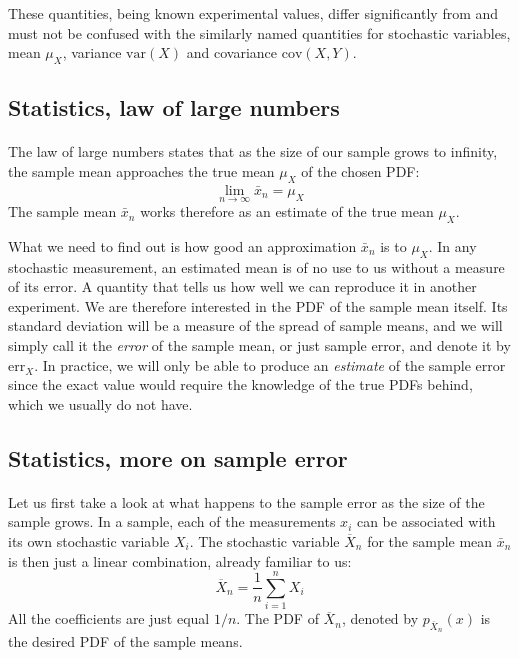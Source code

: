 \documentclass[%
oneside,                 %
final,                   %
10pt]{article}
\begin{document}
These quantities, being known experimental values, differ
significantly from and must not be confused with the similarly named
quantities for stochastic variables, mean $\mu_X$, variance $\mathrm{var}(X)$
and covariance $\mathrm{cov}(X,Y)$.



\subsection*{Statistics, law of large numbers}

\paragraph{}
The law of large numbers
states that as the size of our sample grows to infinity, the sample
mean approaches the true mean $\mu_X^{\phantom X}$ of the chosen PDF:
\[
\lim_{n\to\infty}\bar{x}_n = \mu_X^{\phantom X}
\]
The sample mean $\bar{x}_n$ works therefore as an estimate of the true
mean $\mu_X^{\phantom X}$.

What we need to find out is how good an approximation $\bar{x}_n$ is to
$\mu_X^{\phantom X}$. In any stochastic measurement, an estimated
mean is of no use to us without a measure of its error. A quantity
that tells us how well we can reproduce it in another experiment. We
are therefore interested in the PDF of the sample mean itself. Its
standard deviation will be a measure of the spread of sample means,
and we will simply call it the \emph{error} of the sample mean, or
just sample error, and denote it by $\mathrm{err}_X^{\phantom X}$. In
practice, we will only be able to produce an \emph{estimate} of the
sample error since the exact value would require the knowledge of the
true PDFs behind, which we usually do not have.




\subsection*{Statistics, more on sample error}

\paragraph{}
Let us first take a look at what happens to the sample error as the
size of the sample grows. In a sample, each of the measurements $x_i$
can be associated with its own stochastic variable $X_i$. The
stochastic variable $\overline X_n$ for the sample mean $\bar{x}_n$ is
then just a linear combination, already familiar to us:
\[
\overline X_n = \frac{1}{n}\sum_{i=1}^n X_i
\]
All the coefficients are just equal $1/n$. The PDF of $\overline X_n$,
denoted by $p_{\overline X_n}(x)$ is the desired PDF of the sample
means.
\end{document}
